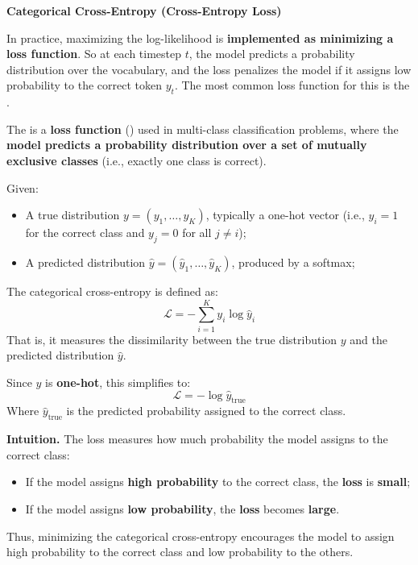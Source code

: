 \highspace
\begin{flushleft}
    \textcolor{Green3}{ \textbf{Categorical Cross-Entropy (Cross-Entropy Loss)}}
\end{flushleft}
In practice, maximizing the log-likelihood is \textbf{implemented as minimizing a loss function}. So at each timestep $t$, the model predicts a probability distribution over the vocabulary, and the loss penalizes the model if it assigns low probability to the correct token $y_t$. The most common loss function for this is the .
\begin{definitionbox}\label{def:categorical-cross-entropy}
    The  is a \textbf{loss function} () used in multi-class classification problems, where the \textbf{model predicts a probability distribution over a set of mutually exclusive classes} (i.e., exactly one class is correct).

    \highspace
    Given:
    \begin{itemize}
        \item A true distribution $y = (y_1, \dots, y_K)$, typically a one-hot vector (i.e., $y_i = 1$ for the correct class and $y_j = 0$ for all $j \neq i$);
        \item A predicted distribution $\hat{y} = (\hat{y}_1, \dots, \hat{y}_K)$, produced by a softmax;
    \end{itemize}
    The categorical cross-entropy is defined as:
    \begin{equation}
        \mathcal{L} = - \sum_{i=1}^{K} y_i \log \hat{y}_i
    \end{equation}
    That is, it measures the dissimilarity between the true distribution $y$ and the predicted distribution $\hat{y}$.

    \highspace
    Since $y$ is \textbf{one-hot}, this simplifies to:
    \begin{equation*}
        \mathcal{L} = - \log \hat{y}_{\text{true}}
    \end{equation*}
    Where $\hat{y}_{\text{true}}$ is the predicted probability assigned to the correct class.

    \highspace
    \textcolor{Green3}{ \textbf{Intuition.}} The loss measures how much probability the model assigns to the correct class:
    \begin{itemize}
        \item If the model assigns \textbf{high probability} to the correct class, the \textbf{loss} is \textbf{small};
        \item If the model assigns \textbf{low probability}, the \textbf{loss} becomes \textbf{large}.
    \end{itemize}
    Thus, minimizing the categorical cross-entropy encourages the model to assign high probability to the correct class and low probability to the others.
\end{definitionbox}

